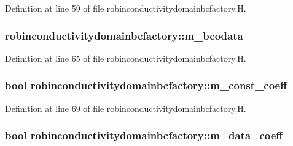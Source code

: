 Definition at line 59 of file robinconductivitydomainbcfactory.\+H.

\subsubsection[{\texorpdfstring{m\+\_\+bcodata}{m_bcodata}}]{ robinconductivitydomainbcfactory\+::m\+\_\+bcodata\hspace{0.3cm}{\ttfamily [protected]}}\hypertarget{classrobinconductivitydomainbcfactory_a7f2db134e4a779c600b1ec35b53c737d}{}\label{classrobinconductivitydomainbcfactory_a7f2db134e4a779c600b1ec35b53c737d}


Definition at line 65 of file robinconductivitydomainbcfactory.\+H.

\subsubsection[{\texorpdfstring{m\+\_\+const\+\_\+coeff}{m_const_coeff}}]{\setlength{\rightskip}{0pt plus 5cm}bool robinconductivitydomainbcfactory\+::m\+\_\+const\+\_\+coeff\hspace{0.3cm}{\ttfamily [protected]}}\hypertarget{classrobinconductivitydomainbcfactory_a50b3b3a13cbdbdfe03c2c44f07b7df87}{}\label{classrobinconductivitydomainbcfactory_a50b3b3a13cbdbdfe03c2c44f07b7df87}


Definition at line 69 of file robinconductivitydomainbcfactory.\+H.

\subsubsection[{\texorpdfstring{m\+\_\+data\+\_\+coeff}{m_data_coeff}}]{\setlength{\rightskip}{0pt plus 5cm}bool robinconductivitydomainbcfactory\+::m\+\_\+data\+\_\+coeff\hspace{0.3cm}{\ttfamily [protected]}}\hypertarget{classrobinconductivitydomainbcfactory_ae0835d3eec0cc52e2f4937f80dd2d7df}{}\label{classrobinconductivitydomainbcfactory_ae0835d3eec0cc52e2f4937f80dd2d7df}


